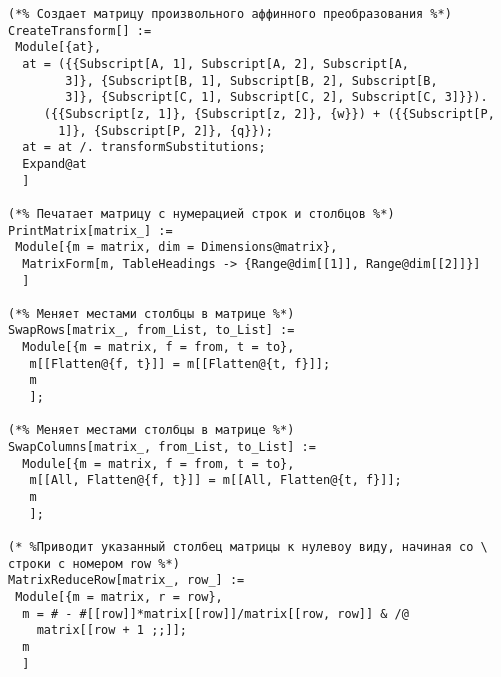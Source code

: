 \documentclass[../main.tex]{subfiles}
\begin{document}
\begin{lstlisting}   
(*% Создает матрицу произвольного аффинного преобразования %*)
CreateTransform[] :=
 Module[{at},
  at = ({{Subscript[A, 1], Subscript[A, 2], Subscript[A, 
        3]}, {Subscript[B, 1], Subscript[B, 2], Subscript[B, 
        3]}, {Subscript[C, 1], Subscript[C, 2], Subscript[C, 3]}}).
     ({{Subscript[z, 1]}, {Subscript[z, 2]}, {w}}) + ({{Subscript[P, 
       1]}, {Subscript[P, 2]}, {q}});
  at = at /. transformSubstitutions;
  Expand@at
  ]
  
(*% Печатает матрицу с нумерацией строк и столбцов %*)
PrintMatrix[matrix_] :=
 Module[{m = matrix, dim = Dimensions@matrix},
  MatrixForm[m, TableHeadings -> {Range@dim[[1]], Range@dim[[2]]}]
  ]
  
(*% Меняет местами столбцы в матрице %*)
SwapRows[matrix_, from_List, to_List] := 
  Module[{m = matrix, f = from, t = to},
   m[[Flatten@{f, t}]] = m[[Flatten@{t, f}]];
   m
   ];
   
(*% Меняет местами столбцы в матрице %*)
SwapColumns[matrix_, from_List, to_List] := 
  Module[{m = matrix, f = from, t = to},
   m[[All, Flatten@{f, t}]] = m[[All, Flatten@{t, f}]];
   m
   ];
   
(* %Приводит указанный столбец матрицы к нулевоу виду, начиная со \
строки с номером row %*)
MatrixReduceRow[matrix_, row_] :=
 Module[{m = matrix, r = row},
  m = # - #[[row]]*matrix[[row]]/matrix[[row, row]] & /@ 
    matrix[[row + 1 ;;]];
  m
  ]
\end{lstlisting}
\end{document}
